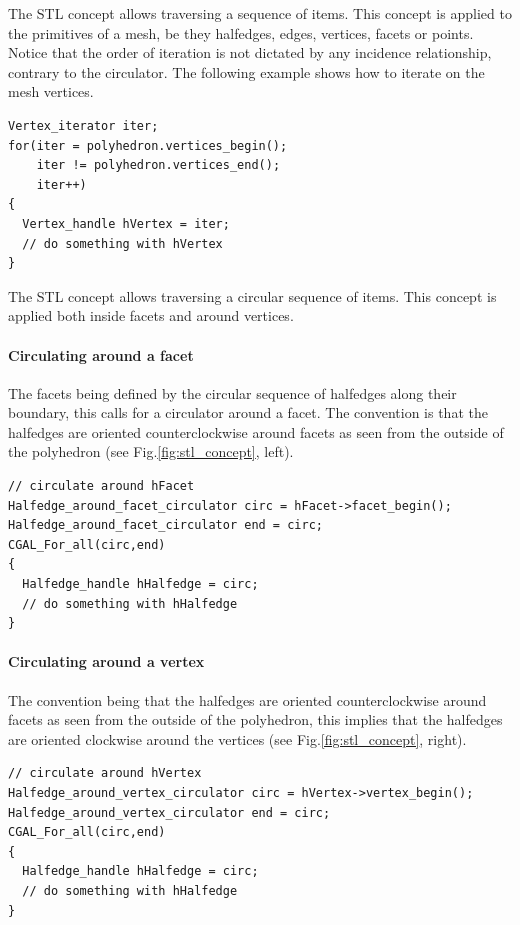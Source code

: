 \documentclass[letter,twoside,10pt]{article}
\begin{document}
The  STL concept allows traversing a sequence of
items. This concept is applied to the primitives of a mesh, be they
halfedges, edges, vertices, facets or points. Notice that the order of
iteration is not dictated by any incidence relationship, contrary to
the circulator. The following example shows how to iterate on the mesh
vertices.

{ \scriptsize
\begin{verbatim}
Vertex_iterator iter;
for(iter = polyhedron.vertices_begin();
    iter != polyhedron.vertices_end();
    iter++)
{
  Vertex_handle hVertex = iter;
  // do something with hVertex
}
\end{verbatim}}

The  STL concept allows traversing a circular
sequence of items. This concept is applied both inside facets and
around vertices. 

\paragraph{Circulating around a facet}
The facets being defined by the circular sequence of halfedges along
their boundary, this calls for a circulator around a facet. The
convention is that the halfedges are oriented counterclockwise around
facets as seen from the outside of the polyhedron (see
Fig.\ref{fig:stl_concept}, left).

{ \scriptsize
\begin{verbatim}
// circulate around hFacet
Halfedge_around_facet_circulator circ = hFacet->facet_begin();
Halfedge_around_facet_circulator end = circ;
CGAL_For_all(circ,end)
{
  Halfedge_handle hHalfedge = circ;
  // do something with hHalfedge
}
\end{verbatim}}

\paragraph{Circulating around a vertex}
The convention being that the halfedges are oriented counterclockwise
around facets as seen from the outside of the polyhedron, this implies
that the halfedges are oriented clockwise around the vertices (see
Fig.\ref{fig:stl_concept}, right).

{ \scriptsize
\begin{verbatim}
// circulate around hVertex
Halfedge_around_vertex_circulator circ = hVertex->vertex_begin();
Halfedge_around_vertex_circulator end = circ;
CGAL_For_all(circ,end)
{
  Halfedge_handle hHalfedge = circ;
  // do something with hHalfedge
}
\end{verbatim}}
\end{document}
